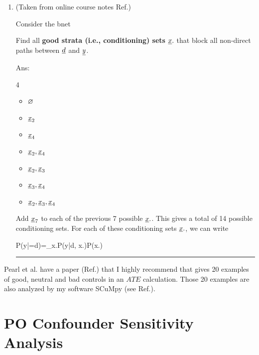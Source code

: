 \begin{enumerate}
\hrule
\item
(Taken from online course notes 
Ref.\cite{ethz-causality})

Consider the bnet

\beq
{}
\eeq
Find all  {\bf good strata (i.e., conditioning) sets} $\rvx.$ that block all
non-direct paths
 between $\rvd$ and $\rvy$.

Ans:
\begin{multicols}{4}
\begin{itemize}
\item $ \varnothing$
\item $\rvx_2$
\item $\rvx_4$
\item $\rvx_2, \rvx_4$
\item $\rvx_2,\rvx_3$
\item $\rvx_3, \rvx_4$
\item $\rvx_2, \rvx_3, \rvx_4$
\end{itemize}
\end{multicols}
Add $\rvx_7$
to each of the previous 7 possible
$\rvx.$. This gives
 a total of 14 possible
 conditioning sets. 
 For each of these conditioning sets $\rvx.$,
 we can write
 
 \beq
 P(y|\cald\rvd=d)=\sum_{x.}P(y|d, x.)P(x.)
 \eeq
 \hrule
\end{enumerate}

Pearl et al. have a paper
(Ref.\cite{pearl-good-neutral-bad})
that I highly recommend
that gives 20 examples
of good, neutral and
bad controls
in an $ATE$ calculation.
Those 20 examples are also analyzed
by my software SCuMpy (see Ref.\cite{scumpy}).

\section{PO Confounder Sensitivity Analysis}
\label{intro-pot-out-sensitivity}

